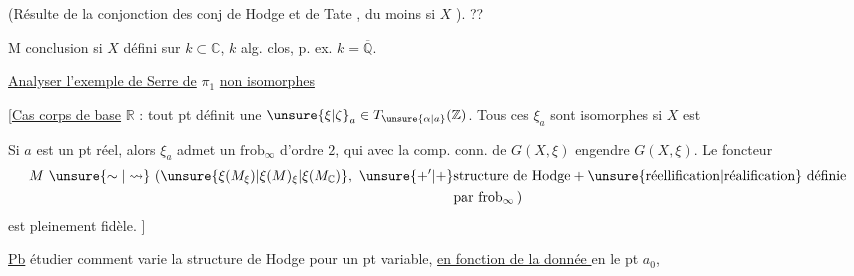 (Résulte de la conjonction des conj de Hodge et de Tate  , du moins si $X$ \uline{}). \uline{} ??
\margin{$\vert\,\vert\,\vert\,\vert\,\vert$}

M conclusion si $X$ défini sur $k\subset\mathbb C$, $k$ alg. clos, p. ex. $k=\overline{\mathbb Q}$.

\begin{center}\uline{Analyser l'exemple de Serre de} $\pi_1$ \uline{non isomorphes}\end{center}

[\uline{Cas corps de base} $\mathbb R$ : tout pt   définit une $\unsure{\xi|\zeta}_a\in T_{\unsure{\alpha|a}}(\mathbb Z)$. Tous ces $\xi_a$ sont isomorphes si  $X$ est   

Si $a$ est un pt réel, alors $\xi_a$ admet un  $\mathrm{frob}_{\infty}$ d'ordre $2$, qui avec la comp. conn. de $G(X,\xi)$ engendre $G(X,\xi)$.
Le foncteur
\[
\begin{aligned}
M\ \unsure{\sim|\leadsto}\ (\unsure{\xi(M_{\xi})|\xi(M)_{\xi}|\xi(M_{\mathbb C})},\ \unsure{+^{\prime}|+}&\text{structure de Hodge}+\text{\unsure{réellification|réalification} définie}\\
&\text{par }\mathrm{frob}_{\infty}\,)
\end{aligned}
\]
est pleinement fidèle. ]

\margin{$\vert\,\vert\,\vert$}
\uline{Pb} étudier comment varie la structure de Hodge pour un pt  variable, \uline{en fonction de la donnée } en le pt $a_0$,

